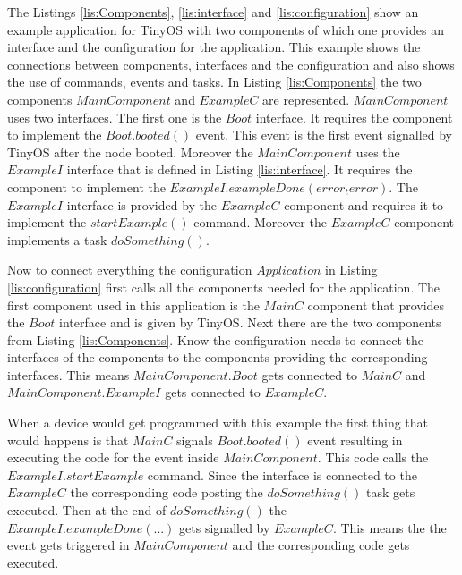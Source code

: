 The Listings \ref{lis:Components}, \ref{lis:interface} and \ref{lis:configuration} show an example application for TinyOS with two components of which one provides an interface and the configuration for the application. This example shows the connections between components, interfaces and the configuration and also shows the use of commands, events and tasks. In Listing \ref{lis:Components} the two components $MainComponent$ and $ExampleC$ are represented. $MainComponent$ uses two interfaces. The first one is the $Boot$ interface. It requires the component to implement the $Boot.booted()$ event. This event is the first event signalled by TinyOS after the node booted. Moreover the $MainComponent$ uses the $ExampleI$ interface that is defined in Listing \ref{lis:interface}. It requires the component to implement the $ExampleI.exampleDone(error_t error)$. The $ExampleI$ interface is provided by the $ExampleC$ component and requires it to implement the $startExample()$ command. Moreover the $ExampleC$ component implements a task $doSomething()$.

Now to connect everything the configuration $Application$ in Listing \ref{lis:configuration} first calls all the components needed for the application. The first component used in this application is the $MainC$ component that provides the $Boot$ interface and is given by TinyOS. Next there are the two components from Listing \ref{lis:Components}. Know the configuration needs to connect the interfaces of the components to the components providing the corresponding interfaces. This means $MainComponent.Boot$ gets connected to $MainC$ and $MainComponent.ExampleI$ gets connected to $ExampleC$.

When a device would get programmed with this example the first thing that would happens is that $MainC$ signals $Boot.booted()$ event resulting in executing the code for the event inside $MainComponent$. This code calls the $ExampleI.startExample$ command. Since the interface is connected to the $ExampleC$ the corresponding code posting the $doSomething()$ task gets executed. Then at the end of $doSomething()$ the $ExampleI.exampleDone(...)$ gets signalled by $ExampleC$. This means the the event gets triggered in $MainComponent$ and the corresponding code gets executed.      

